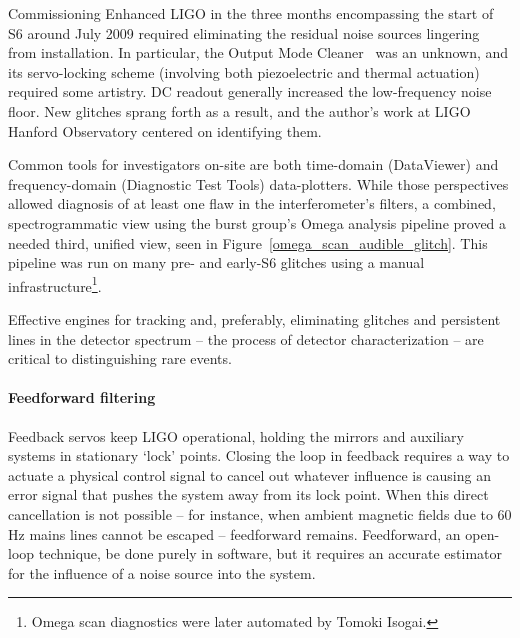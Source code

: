 Commissioning Enhanced LIGO in the three months encompassing the start of S6 around July 2009 required eliminating the residual noise sources lingering from installation. 
In particular, the Output Mode Cleaner~\cite{SmithThesis} was an unknown, and its servo-locking scheme (involving both piezoelectric and thermal actuation) required some artistry.
DC readout generally increased the low-frequency noise floor.
New glitches sprang forth as a result, and the author's work at LIGO Hanford Observatory centered on identifying them.

Common tools for investigators on-site are both time-domain (DataViewer) and frequency-domain (Diagnostic Test Tools) data-plotters.
While those perspectives allowed diagnosis of at least one flaw in the interferometer's filters, a combined, spectrogrammatic view using the burst group's Omega analysis pipeline proved a needed third, unified view, seen in Figure~\ref{omega_scan_audible_glitch}.
This pipeline was run on many pre- and early-S6 glitches using a manual infrastructure\footnote{Omega scan diagnostics were later automated by Tomoki Isogai.}.

Effective engines for tracking and, preferably, eliminating glitches and persistent lines in the detector spectrum -- the process of detector characterization -- are critical to distinguishing rare events.


                \paragraph{Feedforward filtering}
                \label{feedforward_filters}

Feedback servos keep LIGO operational, holding the mirrors and auxiliary systems in stationary `lock' points.
Closing the loop in feedback requires a way to actuate a physical control signal to cancel out whatever influence is causing an error signal that pushes the system away from its lock point.
When this direct cancellation is not possible -- for instance, when ambient magnetic fields due to 60 Hz mains lines cannot be escaped -- feedforward remains.
Feedforward, an open-loop technique, be done purely in software, but it requires an accurate estimator for the influence of a noise source into the system.

